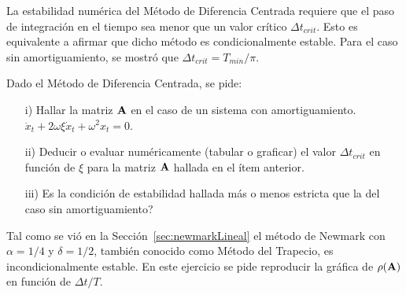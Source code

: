 \bigskip
\begin{exercise}
	
	La estabilidad numérica del Método de Diferencia Centrada requiere que el paso de integración en el tiempo sea menor que un valor crítico $\Delta t_{crit}$. Esto es equivalente a afirmar que dicho método es condicionalmente estable. Para el caso sin amortiguamiento, se mostró que $\Delta t_{crit} = T_{min}/\pi$.
	
	Dado el Método de Diferencia Centrada, se pide:
	
	\begin{itemize}
		\item[i)] Hallar la matriz ${\bf A}$ en el caso de un sistema con amortiguamiento. $\ddot{x}_t + 2\omega\xi\dot{x}_t+\omega^2 x_t=0$.
		\item[ii)] Deducir o evaluar numéricamente (tabular o graficar) el valor $\Delta t_{crit}$ en función de $\xi$ para la matriz ${\bf A}$ hallada en el ítem anterior.
		\item[iii)] \textquestiondown Es la condición de estabilidad hallada más o menos estricta que la del caso sin amortiguamiento?
	\end{itemize}
	
	
\end{exercise}


\bigskip
\begin{exercise}
	
	Tal como se vió en la Sección~\ref{sec:newmarkLineal} el método de Newmark con $\alpha=1/4$ y $\delta=1/2$, también conocido como Método del Trapecio, es incondicionalmente estable. En este ejercicio se pide reproducir la gráfica de $\rho({\bf A})$ en función de $\Delta t / T$.
	
	
\end{exercise}


